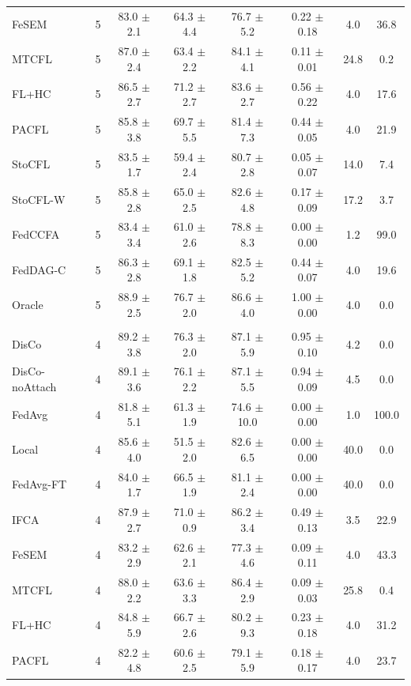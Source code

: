 {\begin{tabular}{l r c c c c c c}
FeSEM & 5 & 83.0 $\pm$ 2.1 & 64.3 $\pm$ 4.4 & 76.7 $\pm$ 5.2 & 0.22 $\pm$ 0.18 & 4.0 & 36.8 \\
MTCFL & 5 & 87.0 $\pm$ 2.4 & 63.4 $\pm$ 2.2 & 84.1 $\pm$ 4.1 & 0.11 $\pm$ 0.01 & 24.8 & 0.2 \\
FL+HC & 5 & 86.5 $\pm$ 2.7 & 71.2 $\pm$ 2.7 & 83.6 $\pm$ 2.7 & 0.56 $\pm$ 0.22 & 4.0 & 17.6 \\
PACFL & 5 & 85.8 $\pm$ 3.8 & 69.7 $\pm$ 5.5 & 81.4 $\pm$ 7.3 & 0.44 $\pm$ 0.05 & 4.0 & 21.9 \\
StoCFL & 5 & 83.5 $\pm$ 1.7 & 59.4 $\pm$ 2.4 & 80.7 $\pm$ 2.8 & 0.05 $\pm$ 0.07 & 14.0 & 7.4 \\
StoCFL-W & 5 & 85.8 $\pm$ 2.8 & 65.0 $\pm$ 2.5 & 82.6 $\pm$ 4.8 & 0.17 $\pm$ 0.09 & 17.2 & 3.7 \\
FedCCFA & 5 & 83.4 $\pm$ 3.4 & 61.0 $\pm$ 2.6 & 78.8 $\pm$ 8.3 & 0.00 $\pm$ 0.00 & 1.2 & 99.0 \\
FedDAG-C & 5 & 86.3 $\pm$ 2.8 & 69.1 $\pm$ 1.8 & 82.5 $\pm$ 5.2 & 0.44 $\pm$ 0.07 & 4.0 & 19.6 \\
Oracle & 5 & 88.9 $\pm$ 2.5 & 76.7 $\pm$ 2.0 & 86.6 $\pm$ 4.0 & 1.00 $\pm$ 0.00 & 4.0 & 0.0 \\
\addlinespace
\multicolumn{8}{l}{\textit{Mixed + QS}} \\
DisCo & 4 & 89.2 $\pm$ 3.8 & 76.3 $\pm$ 2.0 & 87.1 $\pm$ 5.9 & 0.95 $\pm$ 0.10 & 4.2 & 0.0 \\
DisCo-noAttach & 4 & 89.1 $\pm$ 3.6 & 76.1 $\pm$ 2.2 & 87.1 $\pm$ 5.5 & 0.94 $\pm$ 0.09 & 4.5 & 0.0 \\
FedAvg & 4 & 81.8 $\pm$ 5.1 & 61.3 $\pm$ 1.9 & 74.6 $\pm$ 10.0 & 0.00 $\pm$ 0.00 & 1.0 & 100.0 \\
Local & 4 & 85.6 $\pm$ 4.0 & 51.5 $\pm$ 2.0 & 82.6 $\pm$ 6.5 & 0.00 $\pm$ 0.00 & 40.0 & 0.0 \\
FedAvg-FT & 4 & 84.0 $\pm$ 1.7 & 66.5 $\pm$ 1.9 & 81.1 $\pm$ 2.4 & 0.00 $\pm$ 0.00 & 40.0 & 0.0 \\
IFCA & 4 & 87.9 $\pm$ 2.7 & 71.0 $\pm$ 0.9 & 86.2 $\pm$ 3.4 & 0.49 $\pm$ 0.13 & 3.5 & 22.9 \\
FeSEM & 4 & 83.2 $\pm$ 2.9 & 62.6 $\pm$ 2.1 & 77.3 $\pm$ 4.6 & 0.09 $\pm$ 0.11 & 4.0 & 43.3 \\
MTCFL & 4 & 88.0 $\pm$ 2.2 & 63.6 $\pm$ 3.3 & 86.4 $\pm$ 2.9 & 0.09 $\pm$ 0.03 & 25.8 & 0.4 \\
FL+HC & 4 & 84.8 $\pm$ 5.9 & 66.7 $\pm$ 2.6 & 80.2 $\pm$ 9.3 & 0.23 $\pm$ 0.18 & 4.0 & 31.2 \\
PACFL & 4 & 82.2 $\pm$ 4.8 & 60.6 $\pm$ 2.5 & 79.1 $\pm$ 5.9 & 0.18 $\pm$ 0.17 & 4.0 & 23.7 \\

\end{tabular}}
